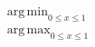 \documentclass[11pt]{article}
\DeclareMathOperator*{\argmin}{arg\,min}
\DeclareMathOperator*{\argmax}{arg\,max}
\begin{document}
\begin{align}
	\argmin_{0 \leq x \leq 1}\\
	\argmax_{0 \leq x \leq 1}
\end{align}
\end{document}
